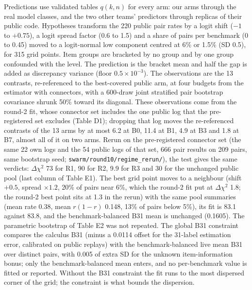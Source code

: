 \documentclass[
]{article}
\begin{document}
Predictions use validated tables \(q(k, n)\) for every arm: our arms
through the real model classes, and the two other teams' predictors
through replicas of their public code. Hypotheses transform the 220
public pair rates by a logit shift (\(-1\) to \(+0.75\)), a logit spread
factor (0.6 to 1.5) and a share of pairs per benchmark (0 to 0.45) moved
to a logit-normal low component centred at 6\% or 1.5\% (SD 0.5), for
315 grid points. Item groups are bracketed by no group and by one group
confounded with the level. The prediction is the bracket mean and half
the gap is added as discrepancy variance (floor \(0.5 \times 10^{-3}\)).
The observations are the 13 contrasts, re-referenced to the best-covered
public arm, at four budgets from the estimator with connectors, with a
600-draw joint stratified pair bootstrap covariance shrunk 50\% toward
its diagonal. These observations come from the round-2 fit, whose
connector set includes the one public log that the pre-registered set
excludes (Table D1); dropping that log moves the re-referenced contrasts
of the 13 arms by at most 6.2 at B0, 11.4 at B1, 4.9 at B3 and 1.8 at
B7, almost all of it on two arms. Rerun on the pre-registered connector
set (the same 22 own logs and the 54 public logs of that set, 666 pair
results on 209 pairs, same bootstrap seed;
\texttt{swarm/round10/regime\_rerun/}), the test gives the same
verdicts: \(\Delta\chi^2\) 73 for R1, 90 for R2, 9.9 for R3 and 30 for
the unchanged public pool (last column of Table E1). The best grid point
moves to a neighbour (shift \(+0.5\), spread \(\times 1.2\), 20\% of
pairs near 6\%, which the round-2 fit put at \(\Delta\chi^2\) 1.8; the
round-2 best point sits at 1.3 in the rerun) with the same pool
summaries (mean rate 0.38, mean \(r(1 - r)\) 0.148, 13\% of pairs below
5\%), its fit is 83.1 against 83.8, and the benchmark-balanced B31 mean
is unchanged (0.1605). The parametric bootstrap of Table E2 was not
repeated. The global B31 constraint compares the calculus B31 (minus a
0.0114 offset for the 31-label estimation error, calibrated on public
replays) with the benchmark-balanced live mean B31 over distinct pairs,
with 0.005 of extra SD for the unknown item-information bonus; only the
benchmark-balanced mean enters, and no per-benchmark value is fitted or
reported. Without the B31 constraint the fit runs to the most dispersed
corner of the grid; the constraint is what bounds the dispersion.
\end{document}
